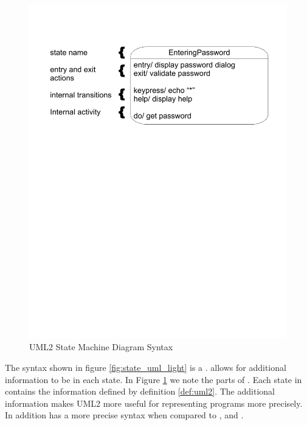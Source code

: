 \begin{figure}[htp]
    \centering
    \includegraphics[trim= 15mm 175mm 15mm 10mm, clip, width=\imgmedium]{./images/state_uml2_syntax_21_4.pdf} 
    \caption{UML2 State Machine Diagram Syntax \cite{UML2}}
    \label{fig:state_uml2}
\end{figure}

The syntax shown in figure \ref{fig:state_uml_light} is a \cite{UML2}. \cite{UML2} allows for additional information to be in each state. In Figure \ref{fig:state_uml2} we note the parts of \cite{UML2}. Each state in  \cite{UML2} contains the information defined by definition \ref{def:uml2}. The additional information makes UML2 more useful for representing programs more precisely. In addition  \cite{UML2} has a more precise syntax when compared to \cite{booth}, and \cite{UML2}.

